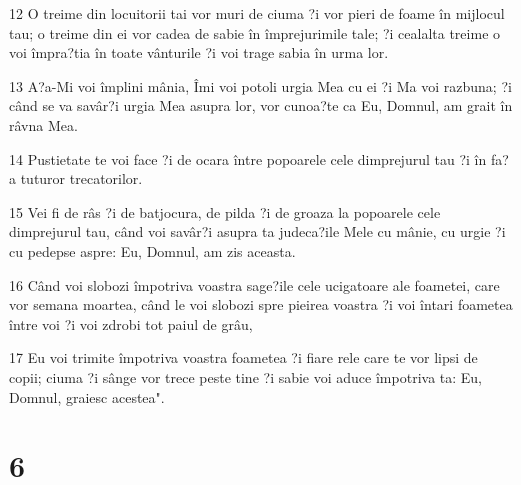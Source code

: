 \par 12 O treime din locuitorii tai vor muri de ciuma ?i vor pieri de foame în mijlocul tau; o treime din ei vor cadea de sabie în împrejurimile tale; ?i cealalta treime o voi împra?tia în toate vânturile ?i voi trage sabia în urma lor.
\par 13 A?a-Mi voi împlini mânia, Îmi voi potoli urgia Mea cu ei ?i Ma voi razbuna; ?i când se va savâr?i urgia Mea asupra lor, vor cunoa?te ca Eu, Domnul, am grait în râvna Mea.
\par 14 Pustietate te voi face ?i de ocara între popoarele cele dimprejurul tau ?i în fa?a tuturor trecatorilor.
\par 15 Vei fi de râs ?i de batjocura, de pilda ?i de groaza la popoarele cele dimprejurul tau, când voi savâr?i asupra ta judeca?ile Mele cu mânie, cu urgie ?i cu pedepse aspre: Eu, Domnul, am zis aceasta.
\par 16 Când voi slobozi împotriva voastra sage?ile cele ucigatoare ale foametei, care vor semana moartea, când le voi slobozi spre pieirea voastra ?i voi întari foametea între voi ?i voi zdrobi tot paiul de grâu,
\par 17 Eu voi trimite împotriva voastra foametea ?i fiare rele care te vor lipsi de copii; ciuma ?i sânge vor trece peste tine ?i sabie voi aduce împotriva ta: Eu, Domnul, graiesc acestea".

\chapter{6}

